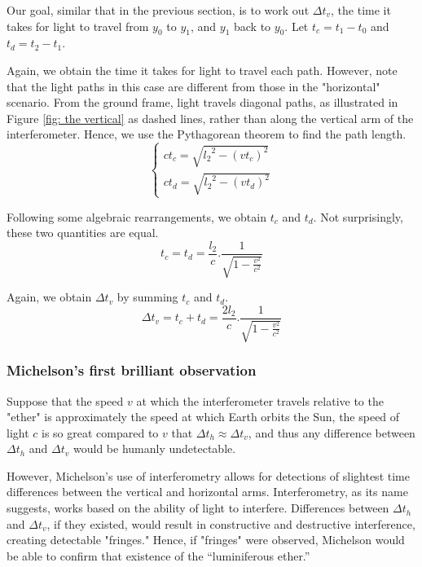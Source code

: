 \documentclass[a4paper,11pt]{article}
\numberwithin{equation}{section}
\begin{document}
 \noindent Our goal, similar that in the previous section, is to work out $\Delta t_{v}$, the time it takes for light to travel from $y_{0}$ to $y_{1}$, and $y_{1}$ back to $y_{0}$. Let $t_{c}=t_{1}-t_{0}$ and $t_{d}=t_{2}-t_{1}$. 
 
 \noindent Again, we obtain the time it takes for light to travel each path. However, note that the light paths in this case are different from those in the "horizontal" scenario. From the ground frame, light travels diagonal paths, as illustrated in Figure \ref{fig: the vertical} as dashed lines, rather than along the vertical arm of the interferometer. Hence, we use the Pythagorean theorem to find the path length.
 \begin{equation} \label{eq:2.5}
 \begin{cases} 
 ct_{c}=\sqrt{{l_{2}}^{2} - {(vt_{c})}^{2}} \\
 ct_{d}=\sqrt{{l_{2}}^{2} - {(vt_{d})}^{2}} 
 \end{cases}
 \end{equation}
 
 \noindent Following some algebraic rearrangements, we obtain $t_{c}$ and $t_{d}$. Not surprisingly, these two quantities are equal.
 \begin{equation} \label{eq:2.6} 
 t_{c}=t_{d}=\frac{l_{2}}{c}.\frac{1}{\sqrt{1-\frac{v^2}{c^2}}}  
 \end{equation}
 
 \noindent Again, we obtain $\Delta t_{v}$ by summing $t_{c}$ and $t_{d}$.
 \begin{equation} \label{eq:2.7}
 \Delta t_{v}=t_{c}+t_{d}=\frac{2l_{2}}{c}.\frac{1}{\sqrt{1-\frac{v^2}{c^2}}}
 \end{equation}
 
 \subsubsection{Michelson's first brilliant observation}
 Suppose that the speed $v$ at which the interferometer travels relative to the "ether" is approximately the speed at which Earth orbits the Sun, the speed of light $c$ is so great compared to $v$ that $\Delta t_{h} \approx \Delta t_{v}$, and thus any difference between $\Delta t_{h}$ and  $\Delta t_{v}$ would be humanly undetectable. 
 
 \noindent However, Michelson's use of interferometry allows for detections of slightest time differences between the vertical and horizontal arms. Interferometry, as its name suggests, works based on the ability of light to interfere. Differences between $\Delta t_{h}$ and  $\Delta t_{v}$, if they existed, would result in constructive and destructive interference, creating detectable "fringes." Hence, if "fringes" were observed, Michelson would be able to confirm that existence of the ``luminiferous ether.''  
 
\end{document}

